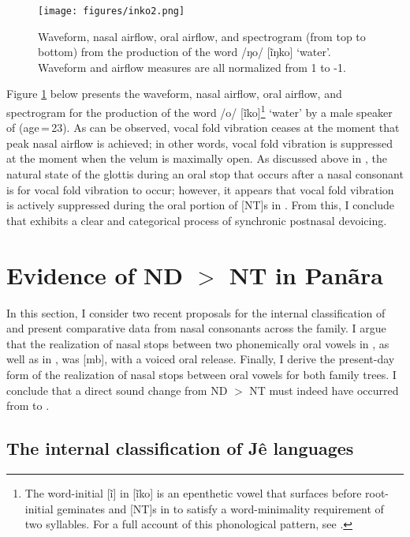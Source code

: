 \documentclass[output=paper,hidelinks]{langscibook}
\begin{document}
\begin{figure}
  \texttt{[image: figures/inko2.png]}
 \caption{Waveform, nasal airflow, oral airflow, and spectrogram (from top to bottom) from the production of the word /ŋo/ [\~iŋko] `water'. Waveform and airflow measures are all normalized from 1 to -1.}
  \label{inko2}
\end{figure}


Figure \ref{inko2} below presents the waveform, nasal airflow, oral airflow, and spectrogram for the production of the word /{\NG}o/ [\~i{\NG}ko]\footnote{The word-initial [\~i] in [\~i{\NG}ko] is an epenthetic vowel that surfaces before root-initial geminates and [NT]s in  to satisfy a word-minimality requirement of two syllables. For a full account of this phonological pattern, see \citet{Lapierre2019}.} `water' by a male speaker of  (age\,=\,23). As can be observed, vocal fold vibration ceases at the moment that peak nasal airflow is achieved; in other words, vocal fold vibration is suppressed at the moment when the velum is maximally open. As discussed above in , the natural state of the glottis during an oral stop that occurs after a nasal consonant is for vocal fold vibration to occur; however, it appears that vocal fold vibration is actively suppressed during the oral portion of [NT]s in . From this, I conclude that  exhibits a clear and categorical process of synchronic postnasal devoicing.

\section{Evidence of ND $>$ NT in Panãra}\label{sec:lapierre:3}

In this section, I consider two recent proposals for the internal classification of  and present comparative data from nasal consonants across the family. I argue that the realization of nasal stops between two phonemically oral vowels in , as well as in , was [mb], with a voiced oral release. Finally, I derive the present-day form of the realization of nasal stops between oral vowels for both family trees. I conclude that a direct sound change from ND $>$ NT must indeed have occurred from  to .

\subsection{The internal classification of Jê languages}
\end{document}
